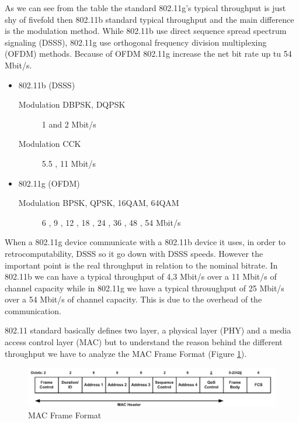 	As we can see from the table the standard 802.11g's typical throughput is just shy of fivefold then 802.11b standard typical throughput and the main difference is the modulation method. While 802.11b use direct sequence spread spectrum signaling (DSSS), 802.11g use orthogonal frequency division multiplexing (OFDM) methods. Because of OFDM 802.11g increase the net bit rate up tu 54 Mbit/s.
	
	\begin{itemize}
		\item 802.11b (DSSS)
			\begin{description}
				\item[Modulation DBPSK, DQPSK] 1 and 2 Mbit/s
				\item[Modulation CCK] 5.5 , 11 Mbit/s
			\end{description}
		\item 802.11g (OFDM)
			\begin{description}
				\item[Modulation BPSK, QPSK, 16QAM, 64QAM] 6 , 9 , 12 , 18 , 24 , 36 , 48 , 54 Mbit/s
			\end{description}
	\end{itemize}

	When a 802.11g device communicate with a 802.11b device it uses, in order to retrocomputability, DSSS  so it go down with DSSS speeds.
	However the important point is the real throughput in relation to the nominal bitrate.
	In 802.11b we can have a typical throughput of 4,3 Mbit/s over a 11 Mbit/s of channel capacity while in 802.11g we have a typical throuughput of 25 Mbit/s over a 54 Mbit/s of channel capacity. This is due to the overhead of the communication.
	
	802.11 standard basically defines two layer, a physical layer (PHY) and a media access control layer (MAC) but to understand the reason behind the different throughput we have to analyze the MAC Frame Format (Figure \ref{mac_packet}).
	
	\begin{figure}[h!]
		\includegraphics[angle=0, keepaspectratio=true, width=15cm]{../images/mac_header2}
		\caption{MAC Frame Format}
		\label{mac_packet}
	\end{figure}
	

